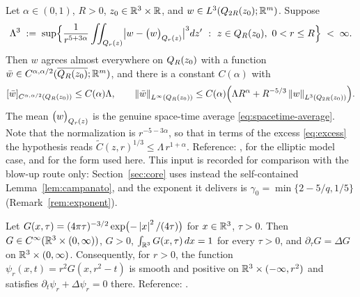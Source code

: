 \documentclass[11pt,reqno]{amsart}
\begin{document}
\begin{externalinput}
\label{ext:campanato}
Let $\alpha\in(0,1)$, $R>0$, $z_{0}\in\mathbb{R}^{3}\times\mathbb{R}$, and
$w\in L^{3}(Q_{2R}(z_{0});\mathbb{R}^{m})$. Suppose
\[
  \Lambda^{3}\;:=\;\sup\Bigl\{\frac1{r^{5+3\alpha}}
    \iint_{Q_{r}(z)}\bigl|w-\bigl(w\bigr)_{Q_{r}(z)}\bigr|^{3}dz'
    \ :\ z\in Q_{R}(z_{0}),\ 0<r\le R\Bigr\}\;<\;\infty .
\]
Then $w$ agrees almost everywhere on $Q_{R}(z_{0})$ with a function
$\bar w\in C^{\alpha,\alpha/2}(\overline{Q_{R}(z_{0})};\mathbb{R}^{m})$, and there is a
constant $C(\alpha)$ with
\[
  [\bar w]_{C^{\alpha,\alpha/2}(Q_{R}(z_{0}))}\le C(\alpha)\Lambda,
  \qquad
  \left\lVert \bar w \right\rVert_{L^{\infty}(Q_{R}(z_{0}))}
   \le C(\alpha)\Bigl(\Lambda R^{\alpha}
     +R^{-5/3}\left\lVert w \right\rVert_{L^{3}(Q_{2R}(z_{0}))}\Bigr).
\]
The mean $\bigl(w\bigr)_{Q_{r}(z)}$ is the genuine space-time average
\eqref{eq:spacetime-average}. Note that the normalization is
$r^{-5-3\alpha}$, so that in terms of the excess \eqref{eq:excess} the
hypothesis reads $\widetilde C(z,r)^{1/3}\le\Lambda\,r^{1+\alpha}$.
Reference: \cite[\S4.2]{LadyzhenskayaSolonnikovUraltseva1968},
\cite[\S III.1]{Giaquinta1983} for the elliptic model case, and
\cite[after (6.24)]{Tsai2018} for the form used here. This input is recorded for
comparison with the blow-up route only: Section~\ref{sec:core} uses instead the
self-contained Lemma~\ref{lem:campanato}, and the exponent it delivers is
$\gamma_{0}=\min\{2-5/q,1/5\}$ (Remark~\ref{rem:exponent}).
\end{externalinput}

\begin{externalinput}\label{ext:heat}
Let $G(x,\tau)=(4\pi\tau)^{-3/2}\exp\bigl(-\left\lvert x \right\rvert^{2}/(4\tau)\bigr)$ for
$x\in\mathbb{R}^{3}$, $\tau>0$. Then $G\in C^{\infty}(\mathbb{R}^{3}\times(0,\infty))$, $G>0$,
$\int_{\mathbb{R}^{3}}G(x,\tau)\,dx=1$ for every $\tau>0$, and
$\partial_{\tau}G=\Delta G$ on $\mathbb{R}^{3}\times(0,\infty)$. Consequently, for
$r>0$, the function $\psi_{r}(x,t)=r^{2}G(x,r^{2}-t)$ is smooth and positive on
$\mathbb{R}^{3}\times(-\infty,r^{2})$ and satisfies
$\partial_{t}\psi_{r}+\Delta\psi_{r}=0$ there.
Reference: \cite[Ch.~2]{Tsai2018}.
\end{externalinput}
\end{document}
